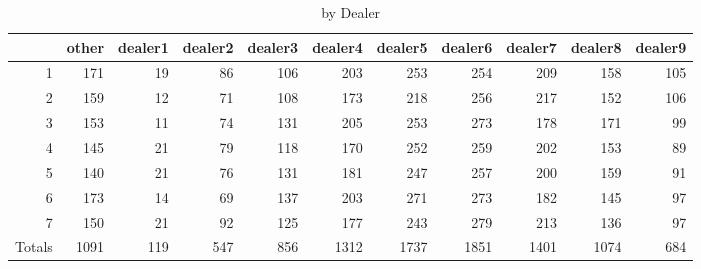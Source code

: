 \begin{table}[ht]
\centering
\begin{tabular}{rrrrrrrrrrr}
  \hline
 & other & dealer1 & dealer2 & dealer3 & dealer4 & dealer5 & dealer6 & dealer7 & dealer8 & dealer9 \\ 
  \hline
1 & 171 & 19 & 86 & 106 & 203 & 253 & 254 & 209 & 158 & 105 \\ 
  2 & 159 & 12 & 71 & 108 & 173 & 218 & 256 & 217 & 152 & 106 \\ 
  3 & 153 & 11 & 74 & 131 & 205 & 253 & 273 & 178 & 171 & 99 \\ 
  4 & 145 & 21 & 79 & 118 & 170 & 252 & 259 & 202 & 153 & 89 \\ 
  5 & 140 & 21 & 76 & 131 & 181 & 247 & 257 & 200 & 159 & 91 \\ 
  6 & 173 & 14 & 69 & 137 & 203 & 271 & 273 & 182 & 145 & 97 \\ 
  7 & 150 & 21 & 92 & 125 & 177 & 243 & 279 & 213 & 136 & 97 \\ 
  Totals & 1091 & 119 & 547 & 856 & 1312 & 1737 & 1851 & 1401 & 1074 & 684 \\ 
   \hline
\end{tabular}
\caption{by Dealer} 
\label{tab:By_dealer}
\end{table}
